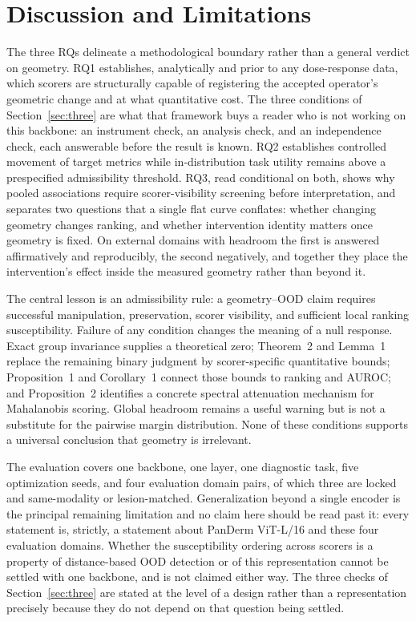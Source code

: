 \documentclass[pdflatex,sn-basic]{sn-jnl}
\theoremstyle{plain}
\theoremstyle{definition}
\theoremstyle{remark}
\begin{document}
\section{Discussion and Limitations}
The three RQs delineate a methodological boundary rather than a general verdict on geometry. RQ1 establishes, analytically and prior to any dose-response data, which scorers are structurally capable of registering the accepted operator's geometric change and at what quantitative cost. The three conditions of Section~\ref{sec:three} are what that framework buys a reader who is not working on this backbone: an instrument check, an analysis check, and an independence check, each answerable before the result is known. RQ2 establishes controlled movement of target metrics while in-distribution task utility remains above a prespecified admissibility threshold. RQ3, read conditional on both, shows why pooled associations require scorer-visibility screening before interpretation, and separates two questions that a single flat curve conflates: whether changing geometry changes ranking, and whether intervention identity matters once geometry is fixed. On external domains with headroom the first is answered affirmatively and reproducibly, the second negatively, and together they place the intervention's effect inside the measured geometry rather than beyond it.

The central lesson is an admissibility rule: a geometry--OOD claim requires successful manipulation, preservation, scorer visibility, and sufficient local ranking susceptibility. Failure of any condition changes the meaning of a null response. Exact group invariance supplies a theoretical zero; Theorem~2 and Lemma~1 replace the remaining binary judgment by scorer-specific quantitative bounds; Proposition~1 and Corollary~1 connect those bounds to ranking and AUROC; and Proposition~2 identifies a concrete spectral attenuation mechanism for Mahalanobis scoring. Global headroom remains a useful warning but is not a substitute for the pairwise margin distribution. None of these conditions supports a universal conclusion that geometry is irrelevant.

The evaluation covers one backbone, one layer, one diagnostic task, five optimization seeds, and four evaluation domain pairs, of which three are locked and same-modality or lesion-matched. Generalization beyond a single encoder is the principal remaining limitation
and no claim here should be read past it: every statement is, strictly, a
statement about PanDerm ViT-L/16 and these four evaluation domains. Whether the
susceptibility ordering across scorers is a property of distance-based OOD
detection or of this representation cannot be settled with one backbone, and is
not claimed either way. The three checks of Section~\ref{sec:three} are stated
at the level of a design rather than a representation precisely because they do
not depend on that question being settled.
\end{document}
